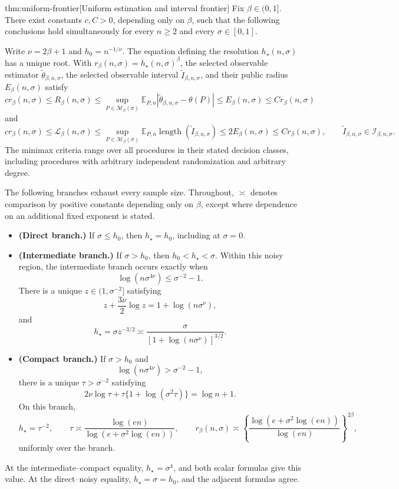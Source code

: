 \begin{theoremv}{thm:uniform-frontier}[Uniform estimation and interval frontier]
Fix \(\beta\in(0,1]\). There exist constants \(c,C>0\), depending only on \(\beta\), such that the following conclusions hold simultaneously for every \(n\ge2\) and every \(\sigma\in[0,1]\).

Write \(\nu=2\beta+1\) and \(h_0=n^{-1/\nu}\). The equation defining the resolution \(h_\star(n,\sigma)\) has a unique root. With \(r_\beta(n,\sigma)=h_\star(n,\sigma)^\beta\), the selected observable estimator \(\widetilde\theta_{\beta,n,\sigma}\), the selected observable interval \(\widetilde I_{\beta,n,\sigma}\), and their public radius \(E_\beta(n,\sigma)\) satisfy
\[
c r_\beta(n,\sigma)
\le R_\beta(n,\sigma)
\le \sup_{P\in\mathcal M_\beta(\sigma)}
\mathbb E_{P,n}
\left|\widetilde\theta_{\beta,n,\sigma}-\theta(P)\right|
\le E_\beta(n,\sigma)
\le C r_\beta(n,\sigma)
\]
and
\[
c r_\beta(n,\sigma)
\le \mathcal L_\beta(n,\sigma)
\le \sup_{P\in\mathcal M_\beta(\sigma)}
\mathbb E_{P,n}
\operatorname{length}(\widetilde I_{\beta,n,\sigma})
\le 2E_\beta(n,\sigma)
\le C r_\beta(n,\sigma),
\qquad
\widetilde I_{\beta,n,\sigma}\in\mathcal I_{\beta,n,\sigma}.
\]
The minimax criteria range over all procedures in their stated decision classes, including procedures with arbitrary independent randomization and arbitrary degree.

The following branches exhaust every sample size. Throughout, \(\asymp\) denotes comparison by positive constants depending only on \(\beta\), except where dependence on an additional fixed exponent is stated.
\begin{itemize}
\item \textbf{(Direct branch.)}
If \(\sigma\le h_0\), then \(h_\star=h_0\), including at \(\sigma=0\).

\item \textbf{(Intermediate branch.)}
If \(\sigma>h_0\), then \(h_0<h_\star<\sigma\). Within this noisy region, the intermediate branch occurs exactly when
\[
\log(n\sigma^{4\nu})\le \sigma^{-2}-1.
\]
There is a unique \(z\in(1,\sigma^{-2}]\) satisfying
\[
z+\frac{3\nu}{2}\log z=1+\log(n\sigma^\nu),
\]
and
\[
h_\star=\sigma z^{-3/2}
\asymp
\frac{\sigma}{[1+\log(n\sigma^\nu)]^{3/2}}.
\]

\item \textbf{(Compact branch.)}
If \(\sigma>h_0\) and
\[
\log(n\sigma^{4\nu})>\sigma^{-2}-1,
\]
there is a unique \(\tau>\sigma^{-2}\) satisfying
\[
2\nu\log\tau+
\tau\{1+\log(\sigma^2\tau)\}
=\log n+1.
\]
On this branch,
\[
h_\star=\tau^{-2},
\qquad
\tau\asymp
\frac{\log(en)}{\log(e+\sigma^2\log(en))},
\qquad
r_\beta(n,\sigma)\asymp
\left\{
\frac{\log(e+\sigma^2\log(en))}{\log(en)}
\right\}^{2\beta},
\]
uniformly over the branch.
\end{itemize}
At the intermediate--compact equality, \(h_\star=\sigma^4\), and both scalar formulas give this value. At the direct--noisy equality, \(h_\star=\sigma=h_0\), and the adjacent formulas agree.


\end{theoremv}
